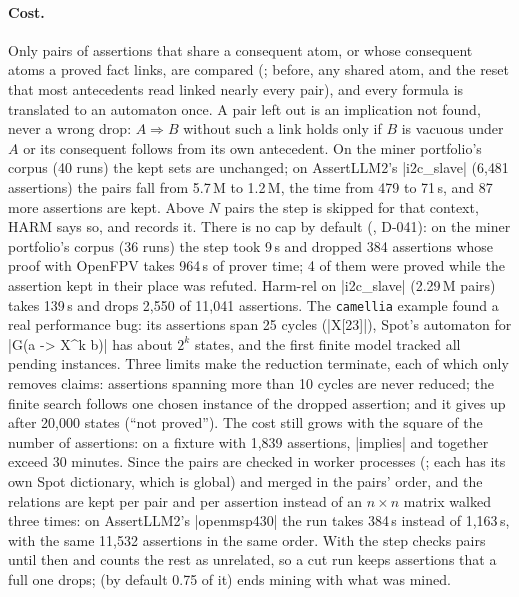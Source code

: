 \paragraph{Cost.} Only pairs of assertions that share a consequent atom, or whose consequent atoms a proved fact links, are compared (; before, any shared atom, and the reset that most antecedents read linked nearly every pair), and every formula is translated to an automaton once. A pair left out is an implication not found, never a wrong drop: $A \Rightarrow B$ without such a link holds only if $B$ is vacuous under $A$ or its consequent follows from its own antecedent. On the miner portfolio's corpus (40 runs) the kept sets are unchanged; on AssertLLM2's \code|i2c_slave| (6{,}481 assertions) the pairs fall from 5.7\,M to 1.2\,M, the time from 479 to 71\,s, and 87 more assertions are kept. Above  $N$ pairs the step is skipped for that context, HARM says so, and  records it. There is no cap by default (, D-041): on the miner portfolio's corpus (36 runs) the step took 9\,s and dropped 384 assertions whose proof with OpenFPV takes 964\,s of prover time; 4 of them were proved while the assertion kept in their place was refuted. Harm-rel on \code|i2c_slave| (2.29\,M pairs) takes 139\,s and drops 2{,}550 of 11{,}041 assertions. The \texttt{camellia} example found a real performance bug: its assertions span 25 cycles (\code|X[23]|), Spot's automaton for \code|G(a -> X^k b)| has about $2^k$ states, and the first finite model tracked all pending instances. Three limits make the reduction terminate, each of which only removes claims: assertions spanning more than 10 cycles are never reduced; the finite search follows one chosen instance of the dropped assertion; and it gives up after 20{,}000 states (``not proved''). The cost still grows with the square of the number of assertions: on a fixture with 1{,}839 assertions, \code|implies| and  together exceed 30 minutes. Since  the pairs are checked in worker processes (; each has its own Spot dictionary, which is global) and merged in the pairs' order, and the relations are kept per pair and per assertion instead of an $n \times n$ matrix walked three times: on AssertLLM2's \code|openmsp430| the run takes 384\,s instead of 1{,}163\,s, with the same 11{,}532 assertions in the same order. With  the step checks pairs until then and counts the rest as unrelated, so a cut run keeps assertions that a full one drops;  (by default 0.75 of it) ends mining with what was mined.

